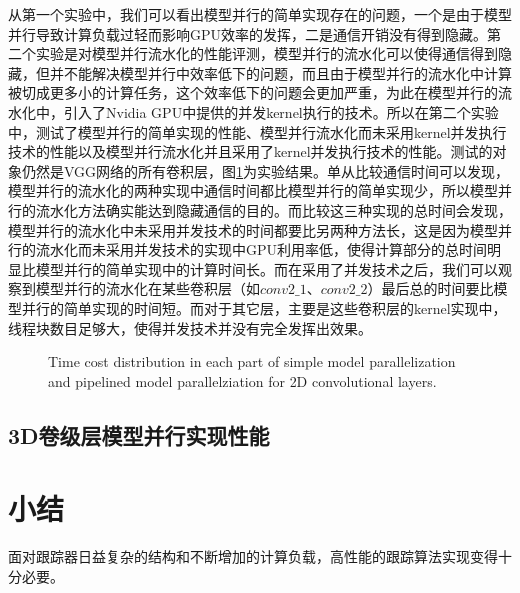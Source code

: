 从第一个实验中，我们可以看出模型并行的简单实现存在的问题，一个是由于模型并行导致计算负载过轻而影响GPU效率的发挥，二是通信开销没有得到隐藏。第二个实验是对模型并行流水化的性能评测，模型并行的流水化可以使得通信得到隐藏，但并不能解决模型并行中效率低下的问题，而且由于模型并行的流水化中计算被切成更多小的计算任务，这个效率低下的问题会更加严重，为此在模型并行的流水化中，引入了Nvidia GPU中提供的并发kernel执行的技术。所以在第二个实验中，测试了模型并行的简单实现的性能、模型并行流水化而未采用kernel并发执行技术的性能以及模型并行流水化并且采用了kernel并发执行技术的性能。测试的对象仍然是VGG网络的所有卷积层，图\ref{simpleAndPipelined}为实验结果。单从比较通信时间可以发现，模型并行的流水化的两种实现中通信时间都比模型并行的简单实现少，所以模型并行的流水化方法确实能达到隐藏通信的目的。而比较这三种实现的总时间会发现，模型并行的流水化中未采用并发技术的时间都要比另两种方法长，这是因为模型并行的流水化而未采用并发技术的实现中GPU利用率低，使得计算部分的总时间明显比模型并行的简单实现中的计算时间长。而在采用了并发技术之后，我们可以观察到模型并行的流水化在某些卷积层（如$conv2\_1$、$conv2\_2$）最后总的时间要比模型并行的简单实现的时间短。而对于其它层，主要是这些卷积层的kernel实现中，线程块数目足够大，使得并发技术并没有完全发挥出效果。

\begin{figure}[tbh]%
\centering
{}
\caption{Time cost distribution in each part of simple model parallelization and pipelined model parallelziation for 2D convolutional layers.}
\label{simpleAndPipelined}
\end{figure}

\subsection{3D卷级层模型并行实现性能}


\section{小结}
面对跟踪器日益复杂的结构和不断增加的计算负载，高性能的跟踪算法实现变得十分必要。













